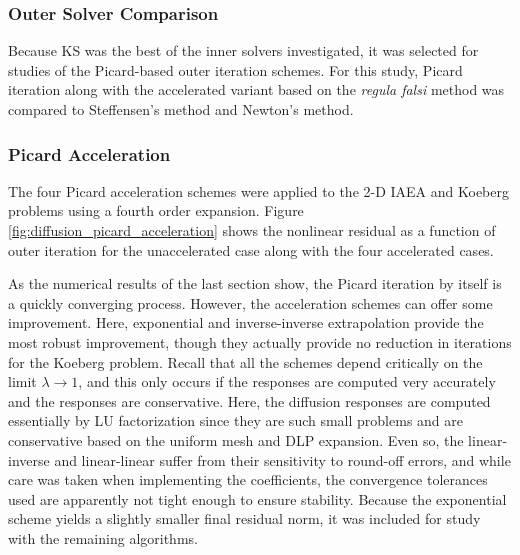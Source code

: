 \subsubsection{Outer Solver Comparison}

Because KS was the best of the inner solvers investigated, it was 
selected for studies of the Picard-based outer iteration schemes.
For this study, Picard iteration along with the accelerated variant 
based on the {\it regula falsi} method was compared to Steffensen's 
method and Newton's method.  

\subsubsection{Picard Acceleration}

The four Picard acceleration schemes were applied to the 2-D IAEA 
and Koeberg problems
using a fourth order expansion.  
Figure \ref{fig:diffusion_picard_acceleration}
shows the nonlinear residual as a function of outer iteration for the 
unaccelerated case along with the four accelerated cases. 

As the numerical results of the last section show, 
the Picard iteration by itself is a 
quickly converging process.  However, the acceleration schemes
can offer some improvement.  Here,
 exponential and inverse-inverse extrapolation provide the 
most robust improvement, though they actually provide no reduction 
in iterations for the Koeberg problem.
Recall that all the schemes depend critically
on the limit $\lambda \to 1$, and this only occurs if the responses are 
computed very accurately and the responses are conservative.  Here, the 
 diffusion responses are computed essentially by LU factorization since 
 they are such small problems and are conservative based on the 
 uniform mesh and DLP expansion.  Even so, the linear-inverse and 
 linear-linear suffer from their sensitivity to round-off errors, and
 while care was taken when implementing the coefficients, the convergence 
 tolerances used are apparently not tight enough to ensure stability.
Because the exponential scheme yields a slightly smaller final residual
norm, it was included for study with the remaining algorithms.
 
